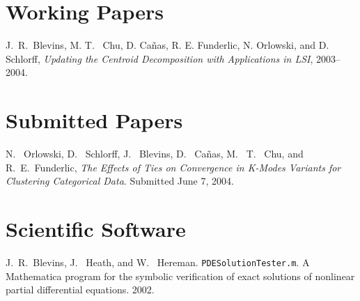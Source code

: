 \documentclass[overlapped,line,draft,11pt,letterpaper]{res}
\begin{document}
\begin{resume}

%


\section{\bf Working Papers}

J.\ R.\ Blevins, M. T. \ Chu, D. Ca\~{n}as, R. E. Funderlic, N.
Orlowski, and D. Schlorff, {\em Updating the Centroid Decomposition
  with Applications in LSI}, 2003--2004.


\section{\bf Submitted Papers}

N. \ Orlowski, D. \ Schlorff, J. \ Blevins, D. \ Ca\~{n}as, M. \ T. \
Chu, and R.\ E.\ Funderlic, {\em The Effects of Ties on Convergence in
  K-Modes Variants for Clustering Categorical Data}. Submitted June 7,
2004.


\section{\bf Scientific Software}

J.\ R.\ Blevins, J. \ Heath, and W. \
Hereman. \texttt{PDESolutionTester.m}.  A Mathematica program for the
symbolic verification of exact solutions of nonlinear partial
differential equations. 2002.



\end{resume}
\end{document}
